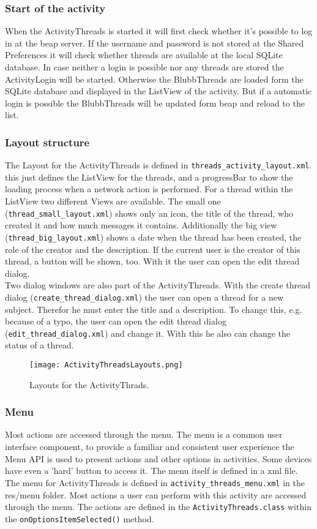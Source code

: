 \documentclass[12pt,a4paper,oneside]{report}
\newcommand{\code}[1]{\lstinline{#1}}
\begin{document}
\subsubsection{Start of the activity}
When the ActivityThreads is started it will first check whether it's possible to log in at the beap server. If the username and password is not stored at the Shared Preferences it will check whether threads are available at the local SQLite database. In case neither a login is possible nor any threads are stored the ActivityLogin will be started. Otherwise the BlubbThreads are loaded form the SQLite database and displayed in the ListView of the activity. But if a automatic login is possible the BlubbThreads will be updated form beap and reload to the list.

\subsubsection{Layout structure}
The Layout for the ActivityThreads is defined in \code{threads_activity_layout.xml}.
this just defines the ListView for the threads, and a progressBar to show the loading process when a network action is performed. For a thread within the ListView two different Views are available. The small one (\code{thread_small_layout.xml}) shows only an icon, the title of the thread, who created it and how much messages it contains. Additionally the big view (\code{thread_big_layout.xml}) shows a date when the thread has been created, the role of the creator and the description. If the current user is the creator of this thread, a button will be shown, too. With it the user can open the edit thread dialog. \\
Two dialog windows are also part of the ActivityThreads. With the create thread dialog (\code{create_thread_dialog.xml}) the user can open a thread for a new subject. Therefor he must enter the title and a description. To change this, e.g. because of a typo, the user can open the edit thread dialog (\code{edit_thread_dialog.xml}) and change it. With this he also can change the status of a thread. 

\begin{figure}[!ht]
	\centering
    \texttt{[image: ActivityThreadsLayouts.png]}
	\caption{Layouts for the ActivityThrads.}
\end{figure}


\subsubsection{Menu}
Most actions are accessed through the menu. The menu is a common user interface component, to provide a familiar and consistent user experience the Menu API is used to present actions and other options in activities\citep{aDefMenu}. Some devices have even a 'hard' button to access it. The menu itself is defined in a xml file. The menu for ActivityThreads is defined in \code{activity_threads_menu.xml} in the res/menu folder.
Most actions a user can perform with this activity are accessed through the menu. The actions are defined in the \code{ActivityThreads.class} within the \code{onOptionsItemSelected()} method.
\end{document}
